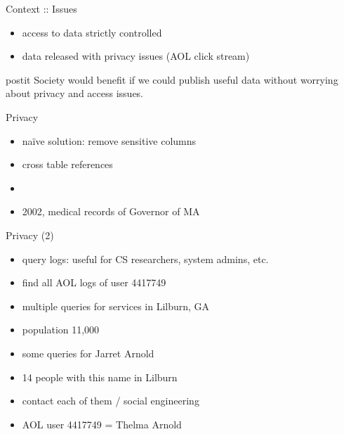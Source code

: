 \documentclass{beamer}
\begin{document}
\begin{frame}{Context :: Issues}
  \begin{itemize}
    \item access to data strictly controlled
    \item data released with privacy issues (AOL click stream)
  \end{itemize}
  \begin{beamercolorbox}[wd=\textwidth,rounded=true,shadow=true]{postit}
    Society would benefit if we could publish useful data without
    worrying about privacy and access issues.
  \end{beamercolorbox}
\end{frame}

\begin{frame}{Privacy}
  \begin{itemize}[<+->]
    \item na\"ive solution: remove sensitive columns
    \item cross table references
    \item {}
    \item 2002, medical records of Governor of MA
  \end{itemize}
\end{frame}

\begin{frame}{Privacy (2)}
  \begin{itemize}[<+->]
    \item query logs: useful for CS researchers, system admins, etc.
    \item find all AOL logs of user 4417749
    \item multiple queries for services in Lilburn, GA
    \item population 11,000
    \item some queries for Jarret Arnold
    \item 14 people with this name in Lilburn
    \item contact each of them / social engineering
    \item AOL user 4417749 = Thelma Arnold
  \end{itemize}
\end{frame}
\end{document}
